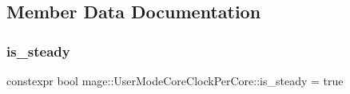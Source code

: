 \subsection{Member Data Documentation}
\hypertarget{structmage_1_1_user_mode_core_clock_per_core_ae41f27cabafd1e7d5b703d3ebf32a97d}{}\label{structmage_1_1_user_mode_core_clock_per_core_ae41f27cabafd1e7d5b703d3ebf32a97d} 
\subsubsection{\texorpdfstring{is\+\_\+steady}{is\_steady}}
{\footnotesize\ttfamily constexpr bool mage\+::\+User\+Mode\+Core\+Clock\+Per\+Core\+::is\+\_\+steady = true\hspace{0.3cm}{\ttfamily [static]}}


